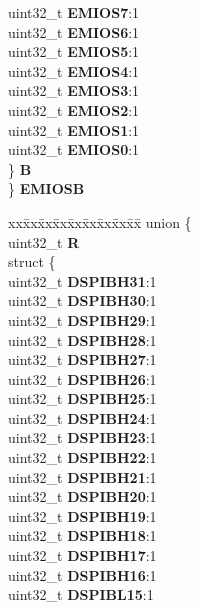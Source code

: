 \begin{DoxyCompactItemize}
\begin{tabbing}
\>\>uint32\_t {\bfseries EMIOS7}:1\\
\>\>uint32\_t {\bfseries EMIOS6}:1\\
\>\>uint32\_t {\bfseries EMIOS5}:1\\
\>\>uint32\_t {\bfseries EMIOS4}:1\\
\>\>uint32\_t {\bfseries EMIOS3}:1\\
\>\>uint32\_t {\bfseries EMIOS2}:1\\
\>\>uint32\_t {\bfseries EMIOS1}:1\\
\>\>uint32\_t {\bfseries EMIOS0}:1\\
\>\} {\bfseries B}\\
\} {\bfseries EMIOSB}\\

\end{tabbing}\item 
\mbox{\label{structSIU__tag_a33526697b5cfa2d4b4d19fdb9bbaf0ce}} 
\begin{tabbing}
xx\=xx\=xx\=xx\=xx\=xx\=xx\=xx\=xx\=\kill
union \{\\
\>uint32\_t {\bfseries R}\\
\>struct \{\\
\>\>uint32\_t {\bfseries DSPIBH31}:1\\
\>\>uint32\_t {\bfseries DSPIBH30}:1\\
\>\>uint32\_t {\bfseries DSPIBH29}:1\\
\>\>uint32\_t {\bfseries DSPIBH28}:1\\
\>\>uint32\_t {\bfseries DSPIBH27}:1\\
\>\>uint32\_t {\bfseries DSPIBH26}:1\\
\>\>uint32\_t {\bfseries DSPIBH25}:1\\
\>\>uint32\_t {\bfseries DSPIBH24}:1\\
\>\>uint32\_t {\bfseries DSPIBH23}:1\\
\>\>uint32\_t {\bfseries DSPIBH22}:1\\
\>\>uint32\_t {\bfseries DSPIBH21}:1\\
\>\>uint32\_t {\bfseries DSPIBH20}:1\\
\>\>uint32\_t {\bfseries DSPIBH19}:1\\
\>\>uint32\_t {\bfseries DSPIBH18}:1\\
\>\>uint32\_t {\bfseries DSPIBH17}:1\\
\>\>uint32\_t {\bfseries DSPIBH16}:1\\
\>\>uint32\_t {\bfseries DSPIBL15}:1\\

\end{tabbing}
\end{DoxyCompactItemize}
